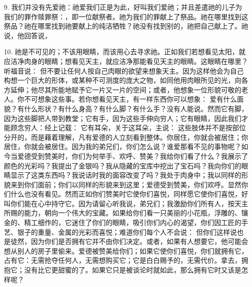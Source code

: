 9.   我们并没有先爱祂：祂爱我们正是为此，好叫我们爱祂；并且差遣祂的儿子为我们的罪作赎罪祭：，即一位献祭者。祂为我们的罪献上了祭品。祂在哪里找到这祭品？祂在哪里找到祂要献上的纯洁牺牲？祂没有找到别的，祂把自己献上了。祂说，他回答说，\par

10.   祂是不可见的；不该用眼睛，而该用心去寻求祂。正如我们若想看见太阳，就应洁净肉身的眼睛；想看见天主，就应洁净那能看见天主的眼睛。这眼睛在哪里？听福音说：  但不要让任何人按自己肉眼的欲望来想象天主。因为这样他会为自己构想一个巨大的形体，或某种不可测度的庞大之物，如同他用肉眼所见的光，向各方延伸；他尽其所能地赋予它一片又一片的空间；或者，他想象一位形貌可敬的老人。你不可想象这些事。若你想看见天主，有一样东西你可以想象： 爱有什么面貌？有什么形状？有什么身高？有什么脚？有什么手？没有人能说。然而它有脚，因为这些脚把人带到教堂；它有手，因为这些手伸向穷人；它有眼睛，因此我们才能顾念穷人：经上记载： 它有耳朵，关于这耳朵，主说：  这些肢体并不是按部位分开的，而是藉着理解，凡有爱德的人立刻看到整体。你居住，你就会被居住；你居住，你就会被居住。因为我的弟兄们，你们怎么说？谁爱那看不见的事物呢？如今当爱德受到赞美时，你们为何举手、欢呼、赞美？我给你们看了什么？我展示了颜色的光彩吗？我提出了金银吗？我从隐藏的宝库中挖出了宝石吗？我向你们的眼睛显示了这类东西吗？我说话时我的面容改变了吗？我处于肉身中；我以同样的形貌来到你们面前；你们以同样的形貌来到这里；爱德受到赞美，你们欢呼。显然你们什么也没有看见。然而正如你们赞美时它使你们喜悦，同样愿它使你们喜悦，好叫你们能在心中持守它。因为请留心听我说，弟兄们；我激励你们所有人，按天主所赐的能力，朝向一个伟大的宝藏。如果给你们看一只美丽的小花瓶，浮雕的、镶金的、精工细作的，它迷住了你们的眼睛，吸引你们内心的渴望，你们因工匠的手艺、银子的重量、金属的光彩而喜悦；难道你们每个人不会说： 但你们这样说也是徒然，因为你们是否拥有它并不由你们决定。或者，如果有人想要它，他可能会想从别人的房子里偷来。爱德被赞美给你们；如果它使你们喜悦，你们就拥有它，占有它：无需抢夺任何人，无需想购买它；它是白白赐予的，无需代价。拿去，拥抱它；没有比它更甜蜜的了。如果它只是被谈论时就如此，那么拥有它时又该是怎样呢？\par

